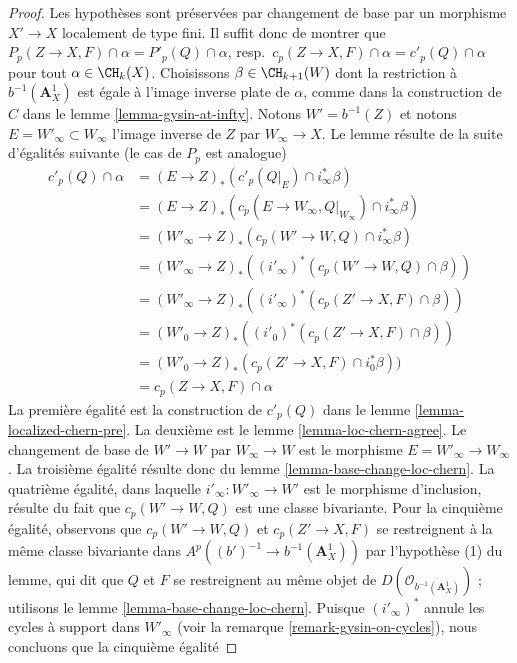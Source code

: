 \begin{proof}
Les hypothèses sont préservées par changement de base par un morphisme
$X' \to X$ localement de type fini. Il suffit donc de montrer que
$P_p(Z \to X, F) \cap \alpha = P'_p(Q) \cap \alpha$,
resp.\ $c_p(Z \to X, F) \cap \alpha = c'_p(Q) \cap \alpha$
pour tout $\alpha \in \CH_k(X)$. Choisissons $\beta \in \CH_{k + 1}(W)$
dont la restriction à $b^{-1}(\mathbf{A}^1_X)$ est égale à
l'image inverse plate de $\alpha$, comme dans la construction de
$C$ dans le lemme \ref{lemma-gysin-at-infty}.
Notons $W' = b^{-1}(Z)$ et notons
$E = W'_\infty \subset W_\infty$ l'image inverse de $Z$
par $W_\infty \to X$.
Le lemme résulte de
la suite d'égalités suivante (le cas de $P_p$ est analogue)
\begin{align*}
c'_p(Q) \cap \alpha
& =
(E \to Z)_*(c'_p(Q|_E) \cap i_\infty^*\beta) \\
& =
(E \to Z)_*(c_p(E \to W_\infty, Q|_{W_\infty}) \cap i_\infty^*\beta) \\
& =
(W'_\infty \to Z)_*(c_p(W' \to W, Q) \cap i_\infty^*\beta) \\
& =
(W'_\infty \to Z)_*((i'_\infty)^*(c_p(W' \to W, Q) \cap \beta)) \\
& =
(W'_\infty \to Z)_*((i'_\infty)^*(c_p(Z' \to X, F) \cap \beta)) \\
& =
(W'_0 \to Z)_*((i'_0)^*(c_p(Z' \to X, F) \cap \beta)) \\
& =
(W'_0 \to Z)_*(c_p(Z' \to X, F) \cap i_0^*\beta)) \\
& =
c_p(Z \to X, F) \cap \alpha
\end{align*}
La première égalité est la construction de $c'_p(Q)$ dans le
lemme \ref{lemma-localized-chern-pre}.
La deuxième est le lemme \ref{lemma-loc-chern-agree}.
Le changement de base de $W' \to W$ par $W_\infty \to W$ est le
morphisme $E = W'_\infty \to W_\infty$. La troisième égalité résulte donc
du lemme \ref{lemma-base-change-loc-chern}. La quatrième
égalité, dans laquelle $i'_\infty : W'_\infty \to W'$ est le
morphisme d'inclusion, résulte du fait que $c_p(W' \to W, Q)$
est une classe bivariante. Pour la cinquième égalité, observons que
$c_p(W' \to W, Q)$ et $c_p(Z' \to X, F)$
se restreignent à la même classe bivariante dans
$A^p((b')^{-1} \to b^{-1}(\mathbf{A}^1_X))$ par
l'hypothèse (1) du lemme, qui dit que $Q$ et $F$ se restreignent
au même objet de $D(\mathcal{O}_{b^{-1}(\mathbf{A}^1_X)})$ ;
utilisons le lemme \ref{lemma-base-change-loc-chern}.
Puisque $(i'_\infty)^*$ annule les cycles à support dans $W'_\infty$
(voir la remarque \ref{remark-gysin-on-cycles}), nous concluons que la cinquième égalité

\end{proof}
